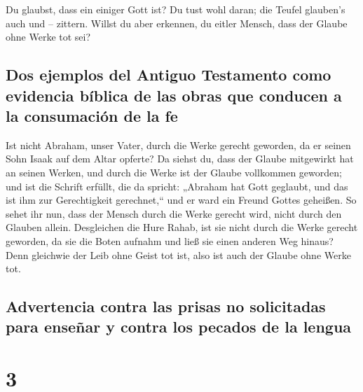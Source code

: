  Du glaubst, dass ein einiger Gott ist? Du tust wohl
daran; die Teufel glauben's auch und -- zittern.  Willst
du aber erkennen, du eitler Mensch, dass der Glaube ohne Werke tot sei?

\hypertarget{dos-ejemplos-del-antiguo-testamento-como-evidencia-buxedblica-de-las-obras-que-conducen-a-la-consumaciuxf3n-de-la-fe}{%
\subsection{Dos ejemplos del Antiguo Testamento como evidencia bíblica
de las obras que conducen a la consumación de la
fe}\label{dos-ejemplos-del-antiguo-testamento-como-evidencia-buxedblica-de-las-obras-que-conducen-a-la-consumaciuxf3n-de-la-fe}}

 Ist nicht Abraham, unser Vater, durch die Werke gerecht
geworden, da er seinen Sohn Isaak auf dem Altar opferte? 
Da siehst du, dass der Glaube mitgewirkt hat an seinen Werken, und durch
die Werke ist der Glaube vollkommen geworden;  und ist
die Schrift erfüllt, die da spricht: „Abraham hat Gott geglaubt, und das
ist ihm zur Gerechtigkeit gerechnet,`` und er ward ein Freund Gottes
geheißen.  So sehet ihr nun, dass der Mensch durch die
Werke gerecht wird, nicht durch den Glauben allein. 
Desgleichen die Hure Rahab, ist sie nicht durch die Werke gerecht
geworden, da sie die Boten aufnahm und ließ sie einen anderen Weg
hinaus?  Denn gleichwie der Leib ohne Geist tot ist, also
ist auch der Glaube ohne Werke tot.

\hypertarget{advertencia-contra-las-prisas-no-solicitadas-para-enseuxf1ar-y-contra-los-pecados-de-la-lengua}{%
\subsection{Advertencia contra las prisas no solicitadas para enseñar y
contra los pecados de la
lengua}\label{advertencia-contra-las-prisas-no-solicitadas-para-enseuxf1ar-y-contra-los-pecados-de-la-lengua}}

\hypertarget{section-2}{%
\section{3}\label{section-2}}

